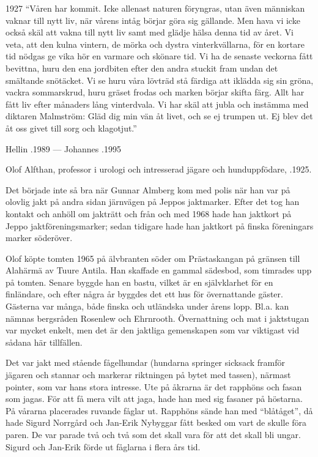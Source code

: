  1927
``Våren har kommit. Icke allenast naturen föryngras, utan även människan vaknar  till nytt liv, när vårens intåg börjar göra sig gällande. Men hava vi icke också skäl att vakna till nytt liv samt med glädje hälsa denna tid av året. Vi veta, att den kulna vintern, de mörka och dystra vinterkvällarna, för en kortare tid nödgas ge vika hör en varmare och skönare tid. Vi ha de senaste veckorna fått bevittna, huru den ena jordbiten efter den andra stuckit fram undan det smältande snötäcket. Vi se huru våra lövträd stå färdiga att iklädda sig sin gröna, vackra sommarskrud, huru gräset frodas och marken börjar skifta färg. Allt har fått liv efter månaders lång vinterdvala. Vi har skäl att jubla och instämma med diktaren Malmström: Gläd dig min vän åt livet, och se ej trumpen ut. Ej blev det åt oss givet till sorg och klagotjut.''

 Hellin .1989  ---  Johannes .1995



%



%
Olof Alfthan, professor i urologi och intresserad jägare och hunduppfödare, .1925.

Det började inte så bra när Gunnar Almberg kom med polis när han 	var på olovlig jakt på andra sidan järnvägen på Jeppos jaktmarker. Efter det tog han kontakt och anhöll om jakträtt och från och med 1968 hade han jaktkort på Jeppo jaktföreningsmarker; sedan tidigare hade han jaktkort på finska föreningars marker söderöver.

Olof köpte tomten 1965 på älvbranten söder om Prästaskangan på gränsen till Alahärmä av Tuure Antila. Han skaffade en gammal sädesbod, som timrades upp på tomten. Senare byggde han en bastu, vilket är en självklarhet för en finländare, och efter några år byggdes det ett hus för övernattande gäster. Gästerna var många, både finska och utländska under årens lopp. Bl.a. kan nämnas bergsråden Rosenlew och Ehrnrooth. Övernattning och mat i jaktstugan var mycket enkelt, men det är den jaktliga gemenskapen som var viktigast vid sådana	här tillfällen.

Det var jakt med stående fågelhundar (hundarna springer sicksack framför jägaren och stannar och markerar riktningen på bytet med tassen), närmast pointer, som var hans stora intresse. Ute på åkrarna är det rapphöns och fasan som jagas. För att få mera vilt att jaga, hade han med sig fasaner på höstarna. På vårarna placerades ruvande fåglar ut. Rapphöns sände han med ``blåtåget'', då hade Sigurd Norrgård och Jan-Erik Nybyggar fått besked om vart de skulle föra paren. De var parade två och två som det skall vara för att det skall bli ungar. Sigurd och Jan-Erik förde ut fåglarna i flera års tid.

